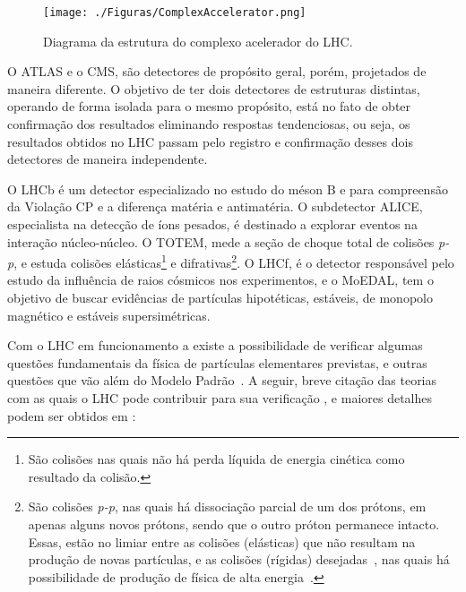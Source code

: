 \begin{figure}[H]
	\begin{center}
		\caption{Diagrama da estrutura do complexo acelerador do LHC.}
		\texttt{[image: ./Figuras/ComplexAccelerator.png]}
		\label{fig:lhcacel}
	\end{center}
\end{figure}

O ATLAS e o CMS, são detectores de propósito geral, porém, projetados de maneira diferente. O objetivo de ter dois detectores de estruturas distintas, operando de forma isolada para o mesmo propósito, está no fato de obter confirmação dos resultados eliminando respostas tendenciosas, ou seja, os resultados obtidos no LHC passam pelo registro e confirmação desses dois detectores de maneira independente.

O LHCb é um detector especializado no estudo do méson B e para compreensão da Violação CP e a diferença matéria e antimatéria. O subdetector ALICE, especialista na detecção de íons pesados, é destinado a explorar eventos na interação núcleo-núcleo. O TOTEM, mede a seção de choque total de colisões \textit{p-p}, e estuda colisões elásticas\footnote{São colisões nas quais não há perda líquida de energia cinética como resultado da colisão.} e difrativas\footnote{São colisões \textit{p-p}, nas quais há dissociação parcial de um dos prótons, em apenas alguns novos prótons, sendo que o outro próton permanece intacto. Essas, estão no limiar entre as colisões (elásticas) que não resultam na produção de novas partículas, e as colisões (rígidas) desejadas~\cite[Cap. 8]{book:Ellwanger2012}, nas quais há possibilidade de produção de física de alta energia~\cite{thesis:werner2018}.}. O LHCf, é o detector responsável pelo estudo da influência de raios cósmicos nos experimentos, e o MoEDAL, tem o objetivo de buscar evidências de partículas hipotéticas, estáveis, de monopolo magnético e estáveis supersimétricas.


Com o LHC em funcionamento a existe a possibilidade de verificar algumas questões fundamentais da física de partículas elementares previstas, e outras questões que vão além do Modelo Padrão~\cite[Cap. 8]{book:Ellwanger2012}. A seguir, breve citação das teorias com as quais o LHC pode contribuir para sua verificação \cite{tcc:werner2011}, e maiores detalhes podem ser obtidos em :


